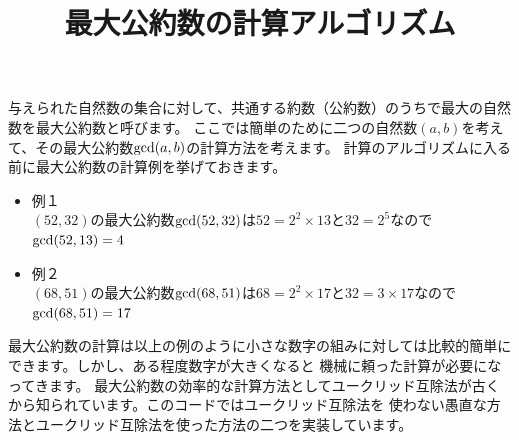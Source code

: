 \documentclass[dvipdfmx]{jarticle}
\title{最大公約数の計算アルゴリズム}
\author{}
\date{}
\begin{document}
\maketitle
与えられた自然数の集合に対して、共通する約数（公約数）のうちで最大の自然数を最大公約数と呼びます。
ここでは簡単のために二つの自然数$(a,b)$を考えて、その最大公約数${\rm gcd}(a,b)$の計算方法を考えます。
計算のアルゴリズムに入る前に最大公約数の計算例を挙げておきます。
\begin{itemize}
\item 例１\\
	$(52,32)$の最大公約数${\rm gcd}(52,32)$は$52=2^{2}\times 13$と$32=2^5$なので${\rm gcd}(52,13)=4$
\item 例２\\
	$(68,51)$の最大公約数${\rm gcd}(68,51)$は$68=2^{2}\times 17$と$32=3\times 17$なので${\rm gcd}(68,51)=17$
\end{itemize}
最大公約数の計算は以上の例のように小さな数字の組みに対しては比較的簡単にできます。しかし、ある程度数字が大きくなると
機械に頼った計算が必要になってきます。
最大公約数の効率的な計算方法としてユークリッド互除法が古くから知られています。このコードではユークリッド互除法を
使わない愚直な方法とユークリッド互除法を使った方法の二つを実装しています。
\end{document}
